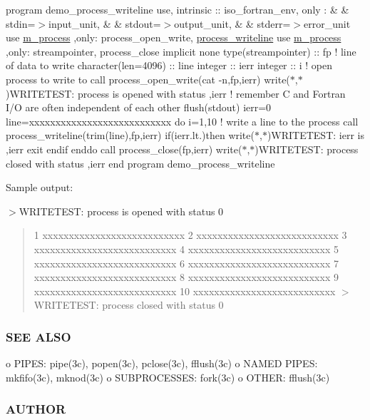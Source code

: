 program demo\+\_\+process\+\_\+writeline use, intrinsic \+:\+: iso\+\_\+fortran\+\_\+env, only \+: \& \& stdin=$>$input\+\_\+unit, \& \& stdout=$>$output\+\_\+unit, \& \& stderr=$>$error\+\_\+unit use \mbox{\hyperlink{namespacem__process}{m\+\_\+process}} ,only\+: process\+\_\+open\+\_\+write, \mbox{\hyperlink{interfacem__process_1_1process__writeline}{process\+\_\+writeline}} use \mbox{\hyperlink{namespacem__process}{m\+\_\+process}} ,only\+: streampointer, process\+\_\+close implicit none type(streampointer) \+:\+: fp ! line of data to write character(len=4096) \+:\+: line integer \+:\+: ierr integer \+:\+: i ! open process to write to call process\+\_\+open\+\_\+write(\textquotesingle{}cat -\/n\textquotesingle{},fp,ierr) write($\ast$,$\ast$)\textquotesingle{}W\+R\+I\+T\+E\+T\+E\+ST\+: process is opened with status \textquotesingle{},ierr ! remember C and Fortran I/O are often independent of each other flush(stdout) ierr=0 line=\textquotesingle{}xxxxxxxxxxxxxxxxxxxxxxxxxxx\textquotesingle{} do i=1,10 ! write a line to the process call process\+\_\+writeline(trim(line),fp,ierr) if(ierr.\+lt.)then write($\ast$,$\ast$)\textquotesingle{}W\+R\+I\+T\+E\+T\+E\+ST\+: ierr is \textquotesingle{},ierr exit endif enddo call process\+\_\+close(fp,ierr) write($\ast$,$\ast$)\textquotesingle{}W\+R\+I\+T\+E\+T\+E\+ST\+: process closed with status \textquotesingle{},ierr end program demo\+\_\+process\+\_\+writeline

Sample output\+:

$>$W\+R\+I\+T\+E\+T\+E\+ST\+: process is opened with status 0 \begin{quote}
1 xxxxxxxxxxxxxxxxxxxxxxxxxxx 2 xxxxxxxxxxxxxxxxxxxxxxxxxxx 3 xxxxxxxxxxxxxxxxxxxxxxxxxxx 4 xxxxxxxxxxxxxxxxxxxxxxxxxxx 5 xxxxxxxxxxxxxxxxxxxxxxxxxxx 6 xxxxxxxxxxxxxxxxxxxxxxxxxxx 7 xxxxxxxxxxxxxxxxxxxxxxxxxxx 8 xxxxxxxxxxxxxxxxxxxxxxxxxxx 9 xxxxxxxxxxxxxxxxxxxxxxxxxxx 10 xxxxxxxxxxxxxxxxxxxxxxxxxxx $>$W\+R\+I\+T\+E\+T\+E\+ST\+: process closed with status 0 \end{quote}


\subsubsection*{S\+EE A\+L\+SO}

o P\+I\+P\+ES\+: pipe(3c), popen(3c), pclose(3c), fflush(3c) o N\+A\+M\+ED P\+I\+P\+ES\+: mkfifo(3c), mknod(3c) o S\+U\+B\+P\+R\+O\+C\+E\+S\+S\+ES\+: fork(3c) o O\+T\+H\+ER\+: fflush(3c) \subsubsection*{A\+U\+T\+H\+OR}

